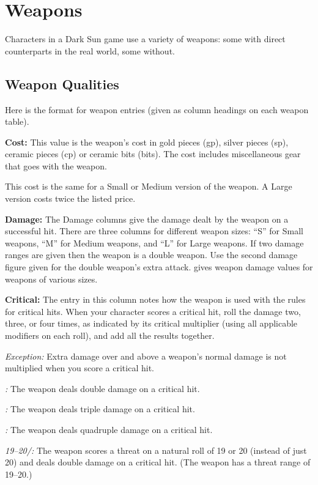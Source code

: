 \section{Weapons}
Characters in a Dark Sun game use a variety of weapons: some with direct counterparts in the real world, some without.




\subsection{Weapon Qualities}
Here is the format for weapon entries (given as column headings on each weapon table).

\textbf{Cost:} This value is the weapon's cost in gold pieces (gp), silver pieces (sp), ceramic pieces (cp) or ceramic bits (bits). The cost includes miscellaneous gear that goes with the weapon.

This cost is the same for a Small or Medium version of the weapon. A Large version costs twice the listed price.

\textbf{Damage:} The Damage columns give the damage dealt by the weapon on a successful hit. There are three columns for different weapon sizes: ``S'' for Small weapons, ``M'' for Medium weapons, and ``L'' for Large weapons. If two damage ranges are given then the weapon is a double weapon. Use the second damage figure given for the double weapon's extra attack.  gives weapon damage values for weapons of various sizes.

\textbf{Critical:} The entry in this column notes how the weapon is used with the rules for critical hits. When your character scores a critical hit, roll the damage two, three, or four times, as indicated by its critical multiplier (using all applicable modifiers on each roll), and add all the results together.

\textit{Exception:} Extra damage over and above a weapon's normal damage is not multiplied when you score a critical hit.

\textit{:} The weapon deals double damage on a critical hit.

\textit{:} The weapon deals triple damage on a critical hit.

\textit{:} The weapon deals quadruple damage on a critical hit.

\textit{19--20/:} The weapon scores a threat on a natural roll of 19 or 20 (instead of just 20) and deals double damage on a critical hit. (The weapon has a threat range of 19--20.)

